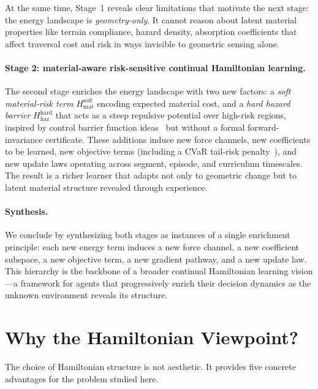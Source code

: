 At the same time, Stage~1 reveals clear limitations that motivate the next
stage: the energy landscape is \emph{geometry-only}.
It cannot reason about latent material properties like terrain compliance, hazard
density, absorption coefficients that affect traversal cost and risk in
ways invisible to geometric sensing alone.

\paragraph{Stage 2: material-aware risk-sensitive continual Hamiltonian learning.}
The second stage enriches the energy landscape with two new factors:
a \emph{soft material-risk term} $H_{\mathrm{mat}}^{\mathrm{soft}}$ encoding
expected material cost, and a \emph{hard hazard barrier}
$H_{\mathrm{haz}}^{\mathrm{hard}}$ that acts as a steep repulsive potential
over high-risk regions, inspired by control barrier function
ideas~\citep{ames2016control} but without a formal forward-invariance certificate.
These additions induce new force channels, new coefficients to be learned,
new objective terms (including a CVaR tail-risk
penalty~\citep{chow2015risk}), and new update laws operating across segment,
episode, and curriculum timescales.
The result is a richer learner that adapts not only to geometric change but
to latent material structure revealed through experience.

\paragraph{Synthesis.}
We conclude by synthesizing both stages as instances of a single
enrichment principle: each new energy term induces a new force channel, a
new coefficient subspace, a new objective term, a new gradient pathway, and
a new update law.
This hierarchy is the backbone of a broader continual Hamiltonian learning
vision—a framework for agents that progressively enrich their decision
dynamics as the unknown environment reveals its structure.

\section{Why the Hamiltonian Viewpoint?}
\label{sec:intro:why}

The choice of Hamiltonian structure is not aesthetic.
It provides five concrete advantages for the problem studied here.

